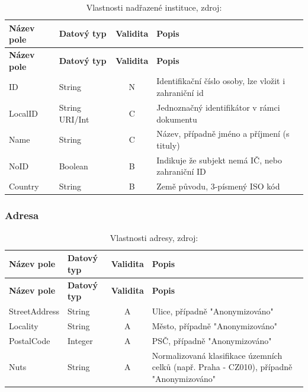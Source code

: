 \begin{center}
\begin{longtable}{lp{20mm}cp{65mm}}
\label{grid_mlmmh} \\
\multicolumn{1}{l}{\textbf{Název pole}} & 
\multicolumn{1}{l}{\textbf{Datový typ}} & 
\multicolumn{1}{l}{\textbf{Validita}} & 
\multicolumn{1}{l}{\textbf{Popis}} \\ \hline 
\endfirsthead
\multicolumn{1}{l}{\textbf{Název pole}} & 
\multicolumn{1}{l}{\textbf{Datový typ}} & 
\multicolumn{1}{l}{\textbf{Validita}} & 
\multicolumn{1}{l}{\textbf{Popis}} \\ \hline 
\hline
\endhead
\endfoot
\caption{Vlastnosti nadřazené instituce, zdroj:\protect\cite{metodika}}
\endlastfoot
ID & String & N & Identifikační číslo osoby, lze vložit i zahraniční id \\
\rowcolor{validateC}LocalID & String URI/Int & C & Jednoznačný identifikátor v rámci dokumentu \\
\rowcolor{validateC}Name & String & C & Název, případně jméno a příjmení (s tituly) \\
\rowcolor{validateB}NoID & Boolean & B & Indikuje že subjekt nemá IČ, nebo zahraniční ID \\
\rowcolor{validateB}Country & String & B & Země původu, 3-písmený ISO kód \\
\end{longtable}
\end{center}

\newpage

\subsubsection*{Adresa}

\begin{center}
\begin{longtable}{lp{20mm}cp{65mm}}
\label{grid_mlmmh} \\
\multicolumn{1}{l}{\textbf{Název pole}} & 
\multicolumn{1}{l}{\textbf{Datový typ}} & 
\multicolumn{1}{l}{\textbf{Validita}} & 
\multicolumn{1}{l}{\textbf{Popis}} \\ \hline 
\endfirsthead
\multicolumn{1}{l}{\textbf{Název pole}} & 
\multicolumn{1}{l}{\textbf{Datový typ}} & 
\multicolumn{1}{l}{\textbf{Validita}} & 
\multicolumn{1}{l}{\textbf{Popis}} \\ \hline 
\hline
\endhead
\endfoot
\caption{Vlastnosti adresy, zdroj:\protect\cite{metodika}}
\endlastfoot
\rowcolor{validateA}StreetAddress & String & A & Ulice, případně "Anonymizováno" \\
\rowcolor{validateA}Locality & String & A & Město, případně "Anonymizováno" \\
\rowcolor{validateA}PostalCode & Integer & A & PSČ, případně "Anonymizováno" \\
\rowcolor{validateA}Nuts & String & A & Normalizovaná klasifikace územních celků (např. Praha - CZ010), případně "Anonymizováno" \\
\end{longtable}
\end{center}

